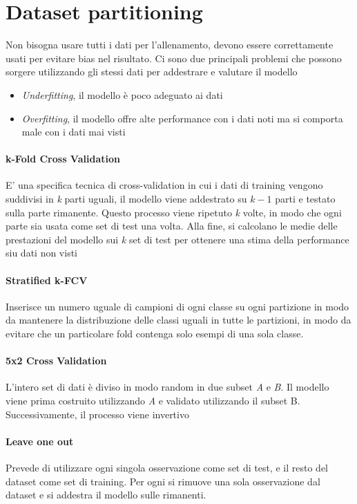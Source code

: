 \section{Dataset partitioning}
Non bisogna usare tutti i dati per l’allenamento, devono essere correttamente usati per evitare bias nel risultato. Ci sono due principali problemi che possono sorgere utilizzando gli stessi dati per addestrare e valutare il modello
\begin{itemize}
    \item \textit{Underfitting}, il modello è poco adeguato ai dati
    \item \textit{Overfitting}, il modello offre alte performance con i dati noti ma si comporta male con i dati mai visti
\end{itemize}

\paragraph{k-Fold Cross Validation}
E' una specifica tecnica di cross-validation in cui i dati di training vengono suddivisi in \textit{k} parti uguali, il modello viene addestrato su $k-1$ parti e testato sulla parte rimanente. Questo processo viene ripetuto \textit{k} volte, in modo che ogni parte sia usata come set di test una volta. Alla fine, si calcolano le medie delle prestazioni del modello sui \textit{k} set di test per ottenere una stima della performance siu dati non visti

\paragraph{Stratified k-FCV}
Inserisce un numero uguale di campioni di ogni classe su ogni partizione in modo da mantenere la distribuzione delle classi uguali in tutte le partizioni, in modo da evitare che un particolare fold contenga solo esempi di una sola classe.

\paragraph{5x2 Cross Validation}
L’intero set di dati è diviso in modo random in due subset \textit{A} e \textit{B}. Il modello viene prima costruito utilizzando \textit{A} e validato utilizzando il subset B. Successivamente, il processo viene invertivo

\paragraph{Leave one out}
Prevede di utilizzare ogni singola osservazione come set di test, e il resto del dataset come set di training. Per ogni si rimuove una sola osservazione dal dataset e si addestra il modello sulle rimanenti.

\newpage